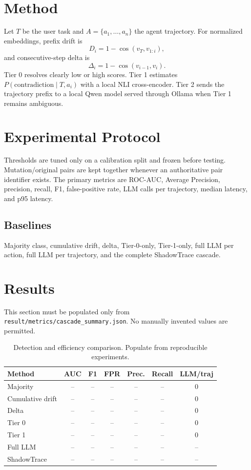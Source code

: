 \documentclass[conference]{IEEEtran}
\begin{document}
\section{Method}
Let $T$ be the user task and $A=\{a_1,\ldots,a_n\}$ the agent trajectory. For normalized embeddings, prefix drift is
\begin{equation}
D_i = 1-\cos(v_T,v_{1:i}),
\end{equation}
and consecutive-step delta is
\begin{equation}
\Delta_i = 1-\cos(v_{i-1},v_i).
\end{equation}
Tier 0 resolves clearly low or high scores. Tier 1 estimates $P(\text{contradiction}\mid T,a_i)$ with a local NLI cross-encoder. Tier 2 sends the trajectory prefix to a local Qwen model served through Ollama when Tier 1 remains ambiguous.

\section{Experimental Protocol}
Thresholds are tuned only on a calibration split and frozen before testing. Mutation/original pairs are kept together whenever an authoritative pair identifier exists. The primary metrics are ROC-AUC, Average Precision, precision, recall, F1, false-positive rate, LLM calls per trajectory, median latency, and p95 latency.

\subsection{Baselines}
Majority class, cumulative drift, delta, Tier-0-only, Tier-1-only, full LLM per action, full LLM per trajectory, and the complete ShadowTrace cascade.

\section{Results}
This section must be populated only from \texttt{result/metrics/cascade\_summary.json}. No manually invented values are permitted.

\begin{table}[t]
\centering
\caption{Detection and efficiency comparison. Populate from reproducible experiments.}
\label{tab:main}
\begin{tabular}{lcccccc}
\toprule
Method & AUC & F1 & FPR & Prec. & Recall & LLM/traj\\
\midrule
Majority & -- & -- & -- & -- & -- & 0\\
Cumulative drift & -- & -- & -- & -- & -- & 0\\
Delta & -- & -- & -- & -- & -- & 0\\
Tier 0 & -- & -- & -- & -- & -- & 0\\
Tier 1 & -- & -- & -- & -- & -- & 0\\
Full LLM & -- & -- & -- & -- & -- & --\\
ShadowTrace & -- & -- & -- & -- & -- & --\\
\bottomrule
\end{tabular}
\end{table}
\end{document}
